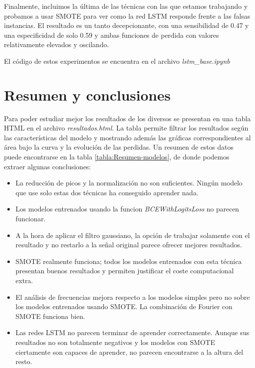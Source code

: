 Finalmente, incluimos la última de las técnicas con las que estamos trabajando y probamos a usar SMOTE para ver como la red LSTM responde frente a las falsas instancias. El resultado es un tanto decepcionante, con una sensibilidad de 0.47 y una especificidad de solo 0.59 y ambas funciones de perdida con valores relativamente elevados y oscilando.

El código de estos experimentos se encuentra en el archivo \textit{lstm\_base.ipynb}

\section{Resumen y conclusiones}

Para poder estudiar mejor los resultados de los diversos se presentan en una tabla HTML en el archivo \textit{resultados.html}. La tabla permite filtrar los resultados según las características del modelo y mostrando además las gráficas correspondientes al área bajo la curva y la evolución de las perdidas. Un resumen de estos datos puede encontrarse en la tabla \ref{tabla:Resumen-modelos}, de donde podemos extraer algunas conclusiones:

\begin{itemize}
    \item La reducción de picos y la normalización no son suficientes. Ningún modelo que use solo estas dos técnicas ha conseguido aprender nada.
    \item Los modelos entrenados usando la funcion \textit{BCEWithLogitsLoss} no parecen funcionar.
    \item A la hora de aplicar el filtro gaussiano, la opción de trabajar solamente con el resultado y no restarlo a la señal original parece ofrecer mejores resultados.
    \item SMOTE realmente funciona; todos los modelos entrenados con esta técnica presentan buenos resultados y permiten justificar el coste computacional extra.
    \item El análisis de frecuencias mejora respecto a los modelos simples pero no sobre los modelos entrenados usando SMOTE. La combinación de Fourier con SMOTE funciona bien.
    \item Las redes LSTM no parecen terminar de aprender correctamente. Aunque sus resultados no son totalmente negativos y los modelos con SMOTE ciertamente son capaces de aprender, no parecen encontrarse a la altura del resto.
\end{itemize}

